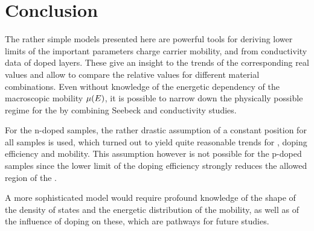 \section{Conclusion}\label{sec:rechConclusion}
The rather simple models presented here are powerful tools for deriving lower limits of the important parameters charge carrier mobility, \nLong and \DopEffLong from conductivity data of doped layers. These give an insight to the trends of the corresponding real values and allow to compare the relative values for different material combinations. Even without knowledge of the energetic dependency of the macroscopic mobility $\mob(E)$, it is possible to narrow down the physically possible regime for the \EtLong by combining Seebeck and conductivity studies.

For the n-doped samples, the rather drastic assumption of a constant \EtLong position for all samples is used, which turned out to yield quite reasonable trends for \neLong, doping efficiency and mobility. This assumption however is not possible for the p-doped samples since the lower limit of the doping efficiency strongly reduces the allowed region of the \EtLong.

A more sophisticated model would require profound knowledge of the shape of the density of states and the energetic distribution of the mobility, as well as of the influence of doping on these, which are pathways for future studies.
